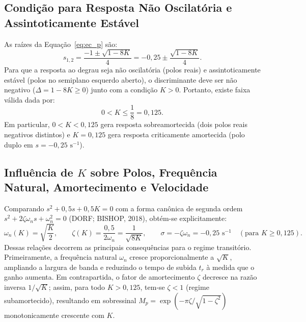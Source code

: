 \subsection{Condição para Resposta Não Oscilatória e Assintoticamente Estável}\label{sec:nao_osc_p}
As raízes da Equação~\eqref{eq:ec_p} são:
\begin{equation}
    s_{1,2} = \frac{-1 \pm \sqrt{1 - 8K}}{4} = -0{,}25 \pm \frac{\sqrt{1 - 8K}}{4}.
\end{equation}
Para que a resposta ao degrau seja não oscilatória (polos reais) e assintoticamente estável (polos no semiplano esquerdo aberto), o discriminante deve ser não negativo ($\Delta = 1 - 8K \ge 0$) junto com a condição $K > 0$. Portanto, existe faixa válida dada por:
\begin{equation}
    0 < K \le \frac{1}{8} = 0{,}125.
\end{equation}
Em particular, $0 < K < 0{,}125$ gera resposta sobreamortecida (dois polos reais negativos distintos) e $K = 0{,}125$ gera resposta criticamente amortecida (polo duplo em $s = -0{,}25\text{ s}^{-1}$).

\subsection{Influência de $K$ sobre Polos, Frequência Natural, Amortecimento e Velocidade}\label{sec:influencia_k}
Comparando $s^2 + 0{,}5s + 0{,}5K = 0$ com a forma canônica de segunda ordem $s^2 + 2\zeta\omega_n s + \omega_n^2 = 0$ (DORF; BISHOP, 2018), obtém-se explicitamente:
\begin{equation}
    \omega_n(K) = \sqrt{\frac{K}{2}}, \qquad \zeta(K) = \frac{0{,}5}{2\omega_n} = \frac{1}{\sqrt{8K}}, \qquad \sigma = -\zeta\omega_n = -0{,}25\text{ s}^{-1} \quad (\text{para } K \ge 0{,}125).
    \label{eq:wn_zeta_p}
\end{equation}
Dessas relações decorrem as principais consequências para o regime transitório. Primeiramente, a frequência natural $\omega_n$ cresce proporcionalmente a $\sqrt{K}$, ampliando a largura de banda e reduzindo o tempo de subida $t_r$ à medida que o ganho aumenta. Em contrapartida, o fator de amortecimento $\zeta$ decresce na razão inversa $1/\sqrt{K}$; assim, para todo $K > 0{,}125$, tem-se $\zeta < 1$ (regime subamortecido), resultando em sobressinal $M_p = \exp\!\left(-\pi\zeta/\sqrt{1-\zeta^2}\right)$ monotonicamente crescente com $K$.


